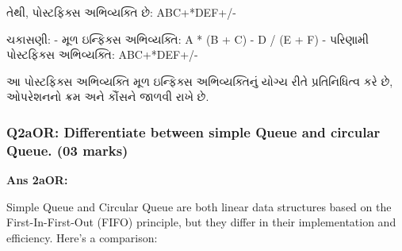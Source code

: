 તેથી, પોસ્ટફિક્સ અભિવ્યક્તિ છે: ABC+*DEF+/-

ચકાસણી: - મૂળ ઇન્ફિક્સ અભિવ્યક્તિ: A * (B + C) - D / (E + F) - પરિણામી
પોસ્ટફિક્સ અભિવ્યક્તિ: ABC+*DEF+/-

આ પોસ્ટફિક્સ અભિવ્યક્તિ મૂળ ઇન્ફિક્સ અભિવ્યક્તિનું યોગ્ય રીતે પ્રતિનિધિત્વ કરે છે,
ઓપરેશનનો ક્રમ અને કૌંસને જાળવી રાખે છે.

\begin{Shaded}
\begin{Highlighting}[]
\end{Highlighting}
\end{Shaded}

\hypertarget{q2aor-differentiate-between-simple-queue-and-circular-queue.-03-marks}{%
\subsubsection{Q2aOR: Differentiate between simple Queue and circular
Queue. (03
marks)}\label{q2aor-differentiate-between-simple-queue-and-circular-queue.-03-marks}}

\textbf{Ans 2aOR:}

Simple Queue and Circular Queue are both linear data structures based on
the First-In-First-Out (FIFO) principle, but they differ in their
implementation and efficiency. Here's a comparison:


